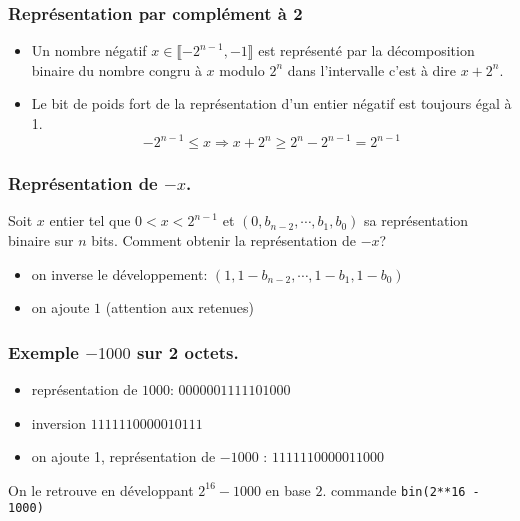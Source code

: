 \begin{frame}
  \frametitle{Représentation par complément à 2}
\begin{itemize}
  \item Un nombre négatif $x\in \llbracket -2^{n-1}, -1 \rrbracket$ est représenté par la décomposition binaire du nombre congru à $x$ modulo $2^{n}$ dans l'intervalle c'est à dire $x + 2^n$.
  \item Le bit de poids fort de la représentation d'un entier négatif est toujours égal à 1. 
\begin{displaymath}
  -2^{n-1} \leq x \Rightarrow x + 2^n \geq 2^n - 2^{n-1} = 2^{n-1}
\end{displaymath}

\end{itemize}
\end{frame}

\begin{frame}
  \frametitle{Représentation de $-x$.}
Soit $x$ entier tel que $0<x<2^{n-1}$ et $(0,b_{n-2},\cdots,b_1,b_0)$ sa représentation binaire sur $n$ bits.\newline
Comment obtenir la représentation de $-x$? 
\begin{itemize}
  \item on inverse le développement: $(1,1-b_{n-2},\cdots,1-b_1,1-b_0)$
  \item on ajoute $1$ (attention aux retenues)
\end{itemize}
\end{frame}

\begin{frame}
  \frametitle{Exemple $-1000$ sur 2 octets.}
\begin{itemize}
  \item représentation de $1000$: $0000001111101000$
  \item inversion $1111110000010111$
  \item on ajoute 1, représentation de $-1000$ : $1111110000011000$ 
\end{itemize}
On le retrouve en développant $2^{16}-1000$ en base $2$.\newline
commande \texttt{bin(2**16 - 1000)}  
\end{frame}


